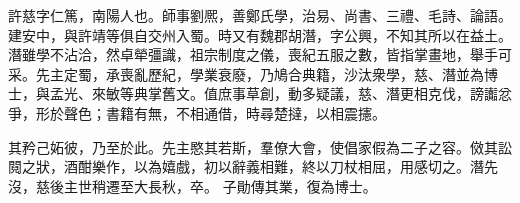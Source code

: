 \begin{pinyinscope}
 
 
 許慈字仁篤，南陽人也。師事劉熈，善鄭氏學，治易、尚書、三禮、毛詩、論語。建安中，與許靖等俱自交州入蜀。時又有魏郡胡潛，字公興，不知其所以在益土。潛雖學不沾洽，然卓犖彊識，祖宗制度之儀，喪紀五服之數，皆指掌畫地，舉手可采。先主定蜀，承喪亂歷紀，學業衰廢，乃鳩合典籍，沙汰衆學，慈、潛並為博士，與孟光、來敏等典掌舊文。值庶事草創，動多疑議，慈、潛更相克伐，謗讟忿爭，形於聲色；書籍有無，不相通借，時尋楚撻，以相震攇。
 
 
 其矜己妬彼，乃至於此。先主愍其若斯，羣僚大會，使倡家假為二子之容。傚其訟䦧之狀，酒酣樂作，以為嬉戲，初以辭義相難，終以刀杖相屈，用感切之。潛先沒，慈後主世稍遷至大長秋，卒。
 子勛傳其業，復為博士。
 
 
\end{pinyinscope}